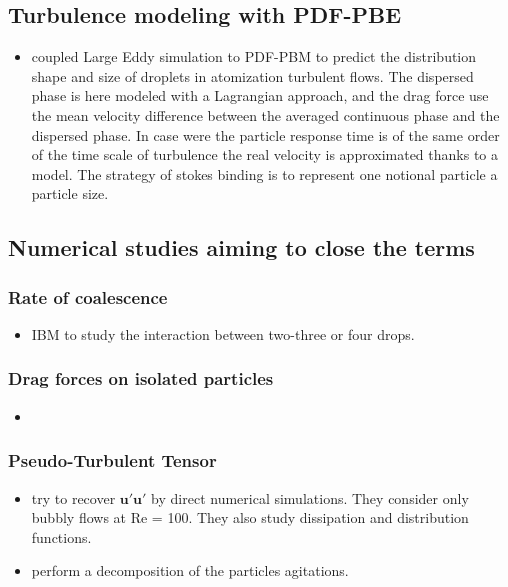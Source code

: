 \subsection{Turbulence modeling with PDF-PBE}
\begin{itemize}
    \item  \citet{salehi2017population} coupled Large Eddy simulation to PDF-PBM to predict the distribution shape and size of droplets in atomization turbulent flows. 
    The dispersed phase is here modeled with a Lagrangian approach, and the drag force use the mean velocity difference between the averaged continuous phase and the dispersed phase.
    In case were the particle response time is of the same order of the time scale of turbulence the real velocity is approximated thanks to a model. 
    The strategy of stokes binding is to represent one notional particle a particle size.
\end{itemize}




\subsection{Numerical studies aiming to close the terms}
\subsubsection{Rate of coalescence}
\begin{itemize}
    \item \citet{manga1995collective} IBM to study the interaction between two-three or four drops.
\end{itemize}
\subsubsection{Drag forces on isolated particles}
\begin{itemize}
    \item \citet{magnaudet1997forces}
\end{itemize}
\subsubsection{Pseudo-Turbulent Tensor}
\begin{itemize}
    \item \citet{esmaeeli2005direct} try to recover $\bm{u'u'}$ by direct numerical simulations. 
    They consider only bubbly flows at Re = 100. 
    They also study dissipation and distribution functions.
    \item \citet{du2022analysis} perform a decomposition of the particles agitations. 
\end{itemize}
